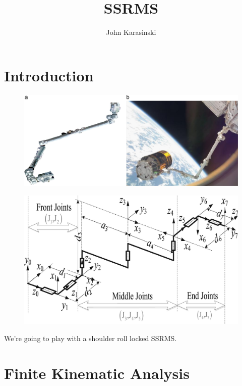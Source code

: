 \documentclass{article}
\author{John Karasinski}
\title{SSRMS}
\begin{document}
\maketitle
\tableofcontents
\clearpage

\section{Introduction}

\begin{figure}[h]
\includegraphics[width=\textwidth]{ssrms.jpg}
\end{figure}
\begin{figure}[h]
\includegraphics[width=\textwidth]{dh.jpg}
\end{figure}
We're going to play with a shoulder roll locked SSRMS.

\section{Finite Kinematic Analysis}
\end{document}
